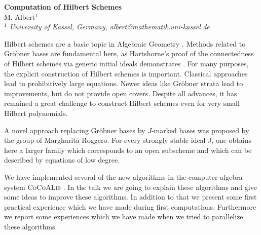 \documentclass[11pt]{article}
\begin{document}
%
\vspace{-0.8cm}
\begin{flushleft}
\Large \textbf{\noindent
Computation of Hilbert Schemes}
\\
\vspace{0.5cm}
\normalsize
\normalsize{
 M. Albert$^1$
} \\
\vspace{5mm}
\textit{\footnotesize
$^1$ University of Kassel, Germany,
albert@mathematik.uni-kassel.de\\
}
\end{flushleft}

Hilbert schemes are a basic topic in Algebraic Geometry \cite{groth,Sernesi}.
Methods related to Gr\"obner bases are fundamental here, as Hartshorne's proof
of the connectedness of Hilbert schemes via generic initial ideals demonstrates
\cite{HartThesis}. For many purposes, the explicit construction of Hilbert
schemes is important. Classical approaches lead to prohibitively large
equations. Newer ideas like Gr\"obner strata \cite{ext,Lederer} lead to
improvements,
but do
not provide open covers.
Despite all advances, it has remained a great challenge to construct Hilbert
schemes even for very small Hilbert polynomials.

A novel approach replacing Gr\"obner bases by $J$-marked bases \cite{BLR,CR} was
proposed by the group of Margharita Roggero. For every strongly stable ideal J,
one obtains here a larger family which corresponds to an open subscheme and
which can be described by equations of low degree.

We have implemented several of the new algorithms in the computer algebra system
\textsc{CoCoALib} \cite{cocoalib}. In the talk we are going to explain these
algorithms and give some ideas to improve these algorithms. In addition to that
we present some first practical experience which we have made during first
computations. Furthermore we report some experiences which we have made when we
tried to parallelize these algorithms.
\end{document}
